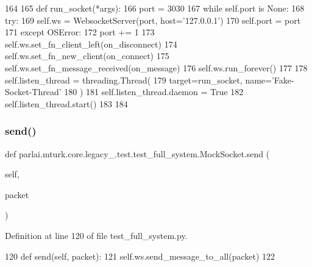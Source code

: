 \begin{DoxyCode}
164 
165         \textcolor{keyword}{def }run\_socket(*args):
166             port = 3030
167             \textcolor{keywordflow}{while} self.port \textcolor{keywordflow}{is} \textcolor{keywordtype}{None}:
168                 \textcolor{keywordflow}{try}:
169                     self.ws = WebsocketServer(port, host=\textcolor{stringliteral}{'127.0.0.1'})
170                     self.port = port
171                 \textcolor{keywordflow}{except} OSError:
172                     port += 1
173             self.ws.set\_fn\_client\_left(on\_disconnect)
174             self.ws.set\_fn\_new\_client(on\_connect)
175             self.ws.set\_fn\_message\_received(on\_message)
176             self.ws.run\_forever()
177 
178         self.listen\_thread = threading.Thread(
179             target=run\_socket, name=\textcolor{stringliteral}{'Fake-Socket-Thread'}
180         )
181         self.listen\_thread.daemon = \textcolor{keyword}{True}
182         self.listen\_thread.start()
183 
184 
\end{DoxyCode}
\mbox{\label{classparlai_1_1mturk_1_1core_1_1legacy__2018_1_1test_1_1test__full__system_1_1MockSocket_abd0988fb013adc98c3ff1b4d1ed40402}} 
\subsubsection{\texorpdfstring{send()}{send()}}
{\footnotesize\ttfamily def parlai.\+mturk.\+core.\+legacy\+\_.\+test.\+test\+\_\+full\+\_\+system.\+Mock\+Socket.\+send (\begin{DoxyParamCaption}\item[{}]{self,  }\item[{}]{packet }\end{DoxyParamCaption})}



Definition at line 120 of file test\+\_\+full\+\_\+system.\+py.


\begin{DoxyCode}
120     \textcolor{keyword}{def }send(self, packet):
121         self.ws.send\_message\_to\_all(packet)
122 
\end{DoxyCode}


